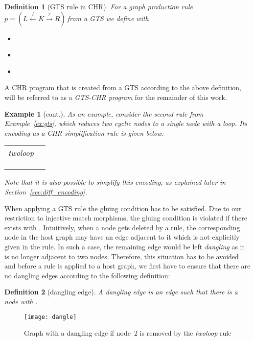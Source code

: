 \documentclass{tlp}
\newtheorem{example}{Example}[section]
\newtheorem{definition}{Definition}[section]
\newcommand{\prodrule}{\ensuremath{p = (L \stackrel{l}{\leftarrow} K
\stackrel{r}{\rightarrow} R)\ }}
\begin{document}
\begin{definition}[GTS rule in CHR]
\label{def:chr_rule}
For a graph production rule~\prodrule from a GTS we define  with
\begin{itemize}
  \item 
  \item \\ 
  \item 
\end{itemize}
\end{definition}

A CHR program that is created from a GTS according to the above definition, will
be referred to as a \emph{GTS-CHR program} for the remainder of this work.

\begin{example}[cont.]\label{ex:twoloop}As an example, consider the second rule
from Example~\ref{ex:gts}, which reduces two cyclic nodes to a single node with
a loop. Its encoding as a CHR simplification rule is given below: \\
\begin{tabular}{ll} 
twoloop  & \\
& \\
& \\
& 
\end{tabular}

Note that it is also possible to simplify this encoding, as explained later in
Section~\ref{sec:diff_encoding}.
\end{example}

When applying a GTS rule the gluing condition has to be satisfied. Due to our
restriction to injective match morphisms, the gluing condition is violated if
there exists  with . Intuitively, when a node gets
deleted by a rule, the corresponding node in the host graph may have an edge
adjacent to it which is not explicitly given in the rule. In such a case, the
remaining edge would be left \emph{dangling} as it is no longer adjacent to two
nodes. Therefore, this situation has to be avoided and before a rule is applied
to a host graph, we first have to ensure that there are no dangling edges
according to the following definition:

\begin{definition}[dangling edge]A \emph{dangling edge} is an edge  such that there is a node  with 
.
\end{definition}

\begin{figure}
\texttt{[image: dangle]}
\caption{Graph with a dangling edge if node~2 is removed by the
\emph{twoloop} rule}
\label{fig:dangle}
\end{figure}
\end{document}
